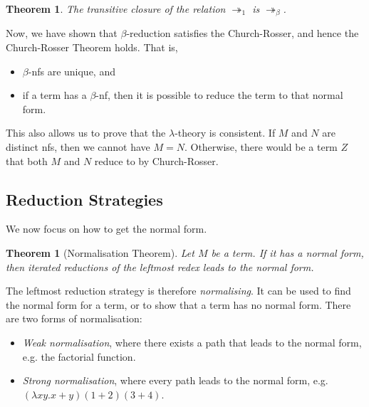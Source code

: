 \documentclass[a4paper, openany]{memoir}
\newtheorem{theorem}[proposition]{Theorem}
\theoremstyle{definition}
\begin{document}
    \begin{theorem}
        The transitive closure of the relation $\twoheadrightarrow_1$ is $\twoheadrightarrow_\beta$.
    \end{theorem}
    \noindent Now, we have shown that $\beta$-reduction satisfies the Church-Rosser, and hence the Church-Rosser Theorem holds. That is,
    \begin{itemize}
        \item $\beta$-nfs are unique, and
        \item if a term has a $\beta$-nf, then it is possible to reduce the term to that normal form.
    \end{itemize}
    This also allows us to prove that the $\lambda$-theory is consistent. If $M$ and $N$ are distinct nfs, then we cannot have $M = N$. Otherwise, there would be a term $Z$ that both $M$ and $N$ reduce to by Church-Rosser.

    \subsection{Reduction Strategies}
    We now focus on how to get the normal form.    
    \begin{theorem}[Normalisation Theorem]
        Let $M$ be a term. If it has a normal form, then iterated reductions of the leftmost redex leads to the normal form.
    \end{theorem}
    \noindent The leftmost reduction strategy is therefore \emph{normalising}. It can be used to find the normal form for a term, or to show that a term has no normal form. There are two forms of normalisation:
    \begin{itemize}
        \item \emph{Weak normalisation}, where there exists a path that leads to the normal form, e.g. the factorial function.
        \item \emph{Strong normalisation}, where every path leads to the normal form, e.g. $(\lambda xy. x + y)(1 + 2)(3 + 4)$.
    \end{itemize}
\end{document}

